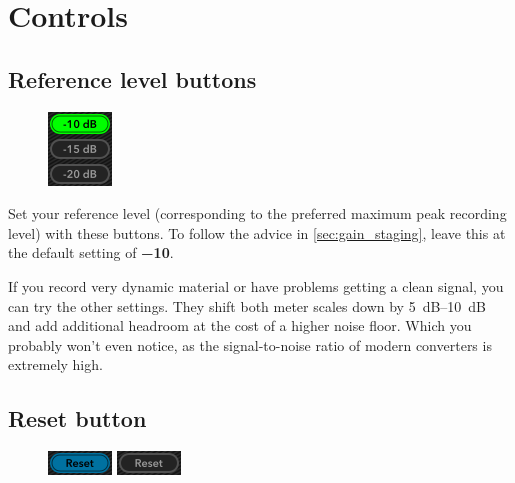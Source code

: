 \chapter{Controls}
\label{chap:controls}

\section{Reference level buttons}
\label{sec:reference_level_buttons}

\begin{figure}
  \includegraphics[scale=\screenshotscale,clip]{include/images/button_recording_level.png}
\end{figure}

Set your reference level (corresponding to the preferred maximum peak
recording level) with these buttons.  To follow the advice in
\ref{sec:gain_staging}, leave this at the default setting of
\textbf{\SI{-10}{\dBFS}}.

If you record very dynamic material or have problems getting a clean
signal, you can try the other settings.  They shift both meter scales
down by \SIrange{5}{10}{\dB} and add additional headroom at the cost
of a higher noise floor.  Which you probably won't even notice, as the
signal-to-noise ratio of modern converters is extremely high.

\section{Reset button}
\label{sec:reset_button}

\begin{figure}
  \includegraphics[scale=\screenshotscale,clip]{include/images/button_reset_on.png}
  \newline \vspace{-0.9\baselineskip}
  \includegraphics[scale=\screenshotscale,clip]{include/images/button_reset_off.png}
\end{figure}

